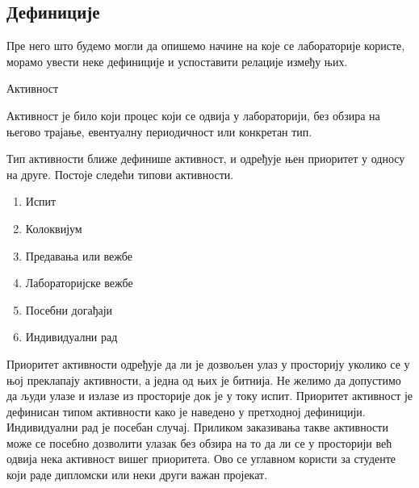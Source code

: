 \documentclass[a4paper, 12pt, diplomski]{etfcyr}
\makeatletter
\newcommand{\indentfirstparagraphoff}{
	\renewenvironment{justify}{%
		\trivlist
		\justifying
		\item\relax
	}{
		\endtrivlist
	}
}
\gdef\tshortstack{\@ifnextchar[\@tshortstack{\@tshortstack[c]}}
\let\@tshortstack\@shortstack
\makeatother
\begin{document}
			\subsection{Дефиниције}

				\begin{justify}
					Пре него што будемо могли да опишемо начине на које се лабораторије користе, морамо увести неке дефиниције и успоставити релације између њих.
				\end{justify}

				\begin{labeling}{\smash{\tshortstack[l]{Корисник\\лабораторије}}}
					\indentfirstparagraphoff

					\item [Активност] 
						\begin{justify}
							Активност је било који процес који се одвија у лабораторији, без обзира на његово трајање, евентуалну периодичност или конкретан тип.
						\end{justify}

					\item[\smash{\tshortstack[l]{Тип\\активности}}]
						\begin{justify}
							Тип активности ближе дефинише активност, и одређује њен приоритет у односу на друге. Постоје следећи типови активности.
							\begin{enumerate}[noitemsep]
								\item Испит
								\item Колоквијум
								\item Предавања или вежбе
								\item Лабораторијске вежбе
								\item Посебни догађаји
								\item Индивидуални рад
							\end{enumerate}
						\end{justify}

					\item[\smash{\tshortstack[l]{Приоритет\\активности}}]
						\begin{justify}
							Приоритет активности одређује да ли је дозвољен улаз у просторију уколико се у њој преклапају активности, а једна од њих је битнија. Не желимо да допустимо да људи улазе и излазе из просторије док је у току испит. Приоритет активност је дефинисан типом активности како је наведено у претходној дефиницији.\\
							Индивидуални рад је посебан случај. Приликом заказивања такве активности може се посебно дозволити улазак без обзира на то да ли се у просторији већ одвија нека активност вишег приоритета. Ово се углавном користи за студенте који раде дипломски или неки други важан пројекат.
						\end{justify}


\end{labeling}
\end{document}
